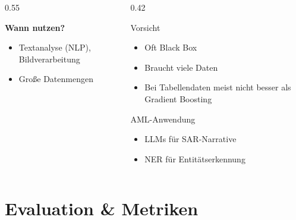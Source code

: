 \documentclass[11pt, aspectratio=169]{beamer}
\begin{document}
\begin{frame}
\begin{columns}[t]
\begin{column}{0.55\textwidth}
\begin{center}
{
            }%
            \end{center}
            \vspace{0.2cm}
            \textbf{Wann nutzen?}
            \begin{itemize}
                \item Textanalyse (NLP), Bildverarbeitung
                \item Große Datenmengen
            \end{itemize}
        \end{column}
        \begin{column}{0.42\textwidth}
            \begin{alertblock}{Vorsicht}
                \begin{itemize}
                    \item Oft \glqq Black Box\grqq
                    \item Braucht viele Daten
                    \item Bei Tabellendaten meist nicht besser als Gradient Boosting
                \end{itemize}
            \end{alertblock}
            \vspace{0.2cm}
            \begin{block}{AML-Anwendung}
                \begin{itemize}
                    \item LLMs für SAR-Narrative
                    \item NER für Entitätserkennung
                \end{itemize}
            \end{block}
        \end{column}
    \end{columns}
\end{frame}

\section{Evaluation \& Metriken}
\end{document}
